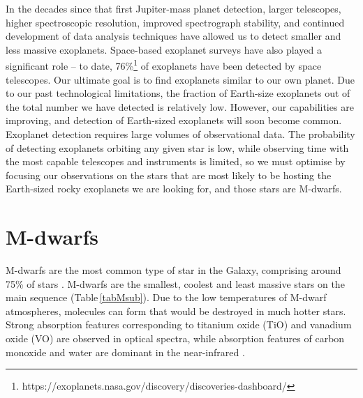 In the decades since that first Jupiter-mass planet detection, larger telescopes, higher spectroscopic resolution, improved spectrograph stability, and continued development of data analysis techniques have allowed us to detect smaller and less massive exoplanets. Space-based exoplanet surveys have also played a significant role -- to date, 76\%\footnote{https://exoplanets.nasa.gov/discovery/discoveries-dashboard/} of exoplanets have been detected by space telescopes. Our ultimate goal is to find exoplanets similar to our own planet. Due to our past technological limitations, the fraction of Earth-size exoplanets out of the total number we have detected is relatively low. However, our capabilities are improving, and detection of Earth-sized exoplanets will soon become common.\\

Exoplanet detection requires large volumes of observational data. The probability of detecting exoplanets orbiting any given star is low, while observing time with the most capable telescopes and instruments is limited, so we must optimise by focusing our observations on the stars that are most likely to be hosting the Earth-sized rocky exoplanets we are looking for, and those stars are M-dwarfs.\\

\section{M-dwarfs}
\label{secMdwarfs}
M-dwarfs are the most common type of star in the Galaxy, comprising around 75\% of stars \citep{2007Tarter}. M-dwarfs are the smallest, coolest and least massive stars on the main sequence (Table\,\ref{tabMsub}). Due to the low temperatures of M-dwarf atmospheres, molecules can form that would be destroyed in much hotter stars. Strong absorption features corresponding to titanium oxide (TiO) and vanadium oxide (VO) are observed in optical spectra, while absorption features of carbon monoxide and water are dominant in the near-infrared \citep{2007Tarter,1943Morgan}.\\

